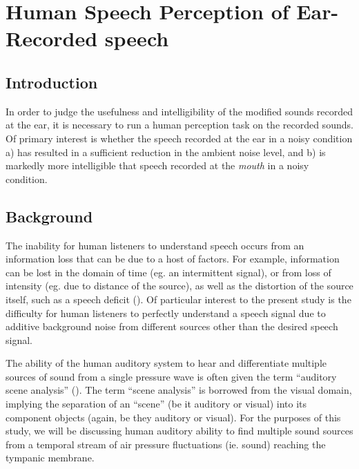\documentclass[dissertation,copyright]{uathesis}
\begin{document}


 



\chapter{Human Speech Perception of Ear-Recorded speech\label{chapter4}}


\section{Introduction}

In order to judge the usefulness and intelligibility of the modified sounds recorded at the ear, it is necessary to run a human perception task on the recorded sounds.  Of primary interest is whether the speech recorded at the ear in a noisy condition a) has resulted in a sufficient reduction in the ambient noise level, and b) is markedly more intelligible that speech recorded at the \textit{mouth} in a noisy condition.

\section{Background}

The inability for human listeners to understand speech occurs from an information loss that can be due to a host of factors.  For example, information can be lost in the domain of time (eg. an intermittent signal), or from loss of intensity (eg. due to distance of the source), as well as the distortion of the source itself, such as a speech deficit (\cite{mattys:12}).  Of particular interest to the present study is the difficulty for human listeners to perfectly understand a speech signal due to additive background noise from different sources other than the desired speech signal.

The ability of the human auditory system to hear and differentiate multiple sources of sound from a single pressure wave is often given the term ``auditory scene analysis'' (\cite{bregman:94}).  The term ``scene analysis'' is borrowed from the visual domain, implying the separation of an ``scene'' (be it auditory or visual) into its component objects (again, be they auditory or visual). For the purposes of this study, we will be discussing human auditory ability to find multiple sound sources from a temporal stream of air pressure fluctuations (ie. sound) reaching the tympanic membrane.
\end{document}
